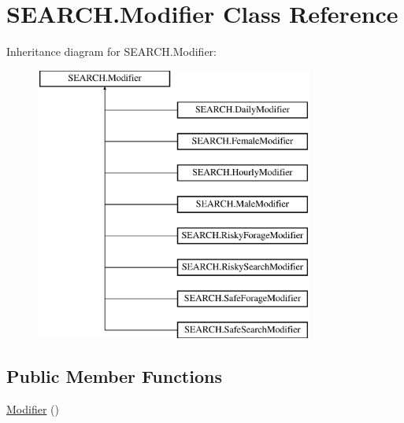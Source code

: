 \hypertarget{class_s_e_a_r_c_h_1_1_modifier}{\section{S\-E\-A\-R\-C\-H.\-Modifier Class Reference}
\label{class_s_e_a_r_c_h_1_1_modifier}
}
Inheritance diagram for S\-E\-A\-R\-C\-H.\-Modifier\-:\begin{figure}[H]
\begin{center}
\leavevmode
\includegraphics[height=9.000000cm]{class_s_e_a_r_c_h_1_1_modifier}
\end{center}
\end{figure}
\subsection*{Public Member Functions}
\begin{DoxyCompactItemize}
\item 
\hyperlink{class_s_e_a_r_c_h_1_1_modifier_a503804f862a61bd58e98945612fc276f}{Modifier} ()
\end{DoxyCompactItemize}
